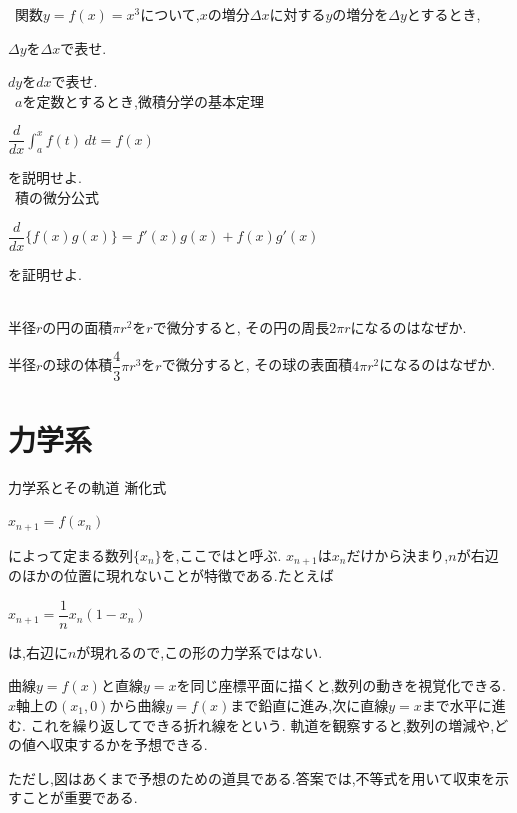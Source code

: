 \documentclass[10pt,fleqn,a4paper]{jsarticle}
\begin{document}
\newpage

\noindent{}\
関数$y=f(x)=x^3$について,$x$の増分$\Delta x$に対する$y$の増分を$\Delta y$とするとき,\
\par\noindent\kakkoichi $\Delta y$を$\Delta x$で表せ.\
\par\noindent\kakkoni $dy$を$dx$で表せ.\\

\noindent\ba{3$\bullet$2}\
$a$を定数とするとき,微積分学の基本定理
\begin{center}
$\displaystyle\dfrac{d}{dx}\int_a^x f(t)\,dt=f(x)$
\end{center}
を説明せよ.\\

\noindent\ba{3$\bullet$3}\
積の微分公式
\begin{center}
$\displaystyle\dfrac{d}{dx}\{f(x)g(x)\}=f'(x)g(x)+f(x)g'(x)$
\end{center}
を証明せよ.\\

\noindent{}\
\par\noindent\kakkoichi 半径$r$の円の面積$\pi r^2$を$r$で微分すると,
その円の周長$2\pi r$になるのはなぜか.\
\par\noindent\kakkoni 半径$r$の球の体積$\dfrac{4}{3}\pi r^3$を$r$で微分すると,
その球の表面積$4\pi r^2$になるのはなぜか.\
\newpage
\section{力学系}

\begin{itembox}
[l]{\enpitu 力学系とその軌道}
漸化式
\begin{center}
$x_{n+1}=f(x_n)$
\end{center}
によって定まる数列$\{x_n\}$を,ここではと呼ぶ.
$x_{n+1}$は$x_n$だけから決まり,$n$が右辺のほかの位置に現れないことが特徴である.たとえば
\begin{center}
$x_{n+1}=\dfrac{1}{n}x_n(1-x_n)$
\end{center}
は,右辺に$n$が現れるので,この形の力学系ではない.

曲線$y=f(x)$と直線$y=x$を同じ座標平面に描くと,数列の動きを視覚化できる.
$x$軸上の$(x_1,0)$から曲線$y=f(x)$まで鉛直に進み,次に直線$y=x$まで水平に進む.
これを繰り返してできる折れ線を\textgt{軌道}という.
軌道を観察すると,数列の増減や,どの値へ収束するかを予想できる.

ただし,図はあくまで予想のための道具である.答案では,不等式を用いて収束を示すことが重要である.
\end{itembox}
\end{document}
